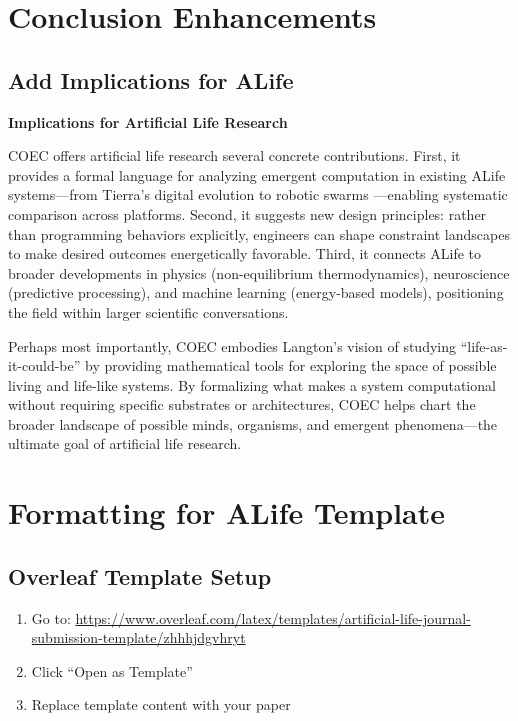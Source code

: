 \documentclass[11pt]{article}
\begin{document}
\section{Conclusion Enhancements} \label{sec:conclusion}

\subsection{Add Implications for ALife}

\begin{tcolorbox}[colback=add!10,colframe=add,title=ADD before final paragraph of Conclusion]
\textbf{Implications for Artificial Life Research}

COEC offers artificial life research several concrete contributions. First, it provides a formal language for analyzing emergent computation in existing ALife systems—from Tierra's digital evolution \cite{ray1991evolution} to robotic swarms \cite{bonabeau1999swarm}—enabling systematic comparison across platforms. Second, it suggests new design principles: rather than programming behaviors explicitly, engineers can shape constraint landscapes to make desired outcomes energetically favorable. Third, it connects ALife to broader developments in physics (non-equilibrium thermodynamics), neuroscience (predictive processing), and machine learning (energy-based models), positioning the field within larger scientific conversations.

Perhaps most importantly, COEC embodies Langton's vision of studying ``life-as-it-could-be'' by providing mathematical tools for exploring the space of possible living and life-like systems. By formalizing what makes a system computational without requiring specific substrates or architectures, COEC helps chart the broader landscape of possible minds, organisms, and emergent phenomena—the ultimate goal of artificial life research.
\end{tcolorbox}

\section{Formatting for ALife Template}

\subsection{Overleaf Template Setup}

\begin{enumerate}
    \item Go to: \url{https://www.overleaf.com/latex/templates/artificial-life-journal-submission-template/zhhhjdgvhryt}
    \item Click ``Open as Template''
    \item Replace template content with your paper
\end{enumerate}
\end{document}
